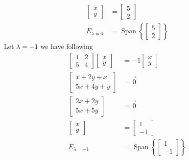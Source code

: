 \documentclass{article}
\DeclareMathOperator{\SPAN}{Span}
\begin{document}
\begin{align*}
        \left[ \begin{array}{c}   
        x \\
        y
        \end{array} \right] &=  
        \left[ \begin{array}{c}   
        5 \\
        2 
        \end{array} \right] \\ 
        \mathit{E}_{\lambda=6} &= \SPAN \left\{
            \left[ \begin{array}{c}   
            5 \\
            2 
            \end{array} \right]
        \right\}
\end{align*}
Let $\lambda = -1$ we have following
\begin{align*}
        \begin{bmatrix}
        1 & 2 \\
        5 & 4  
        \end{bmatrix} 
        \left[ \begin{array}{c} 
        x \\
        y 
        \end{array} 
        \right]  &= 
        -1\left[ \begin{array}{c} 
        x \\
        y 
        \end{array} \right] \\
        \left[ \begin{array}{c} 
        x + 2y + x\\
        5x + 4y + y 
        \end{array} 
        \right] &= \vec{0} \\
        \left[ \begin{array}{c} 
        2x + 2y \\
        5x + 5y 
        \end{array} 
        \right] &= \vec{0} \\
        \left[ \begin{array}{c} 
        x \\
        y 
        \end{array} 
        \right] &= 
        \left[\begin{array}{c} 
        1 \\
        -1 
        \end{array} 
        \right] \\ 
        \mathit{E}_{\lambda=-1} &= \SPAN \left\{
            \left[ \begin{array}{c}   
            1 \\
            -1 
            \end{array} \right]
        \right\}
\end{align*}
\end{document}
